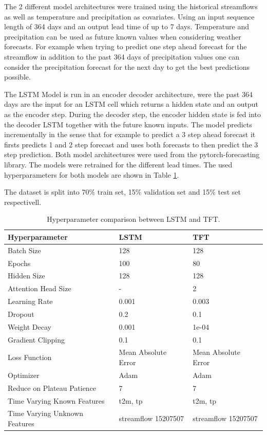 \documentclass[
]{krantz}
\begin{document}
The 2 different model architectures were trained using the historical streamflows as well as temperature and precipitation as covariates. Using an input sequence length of 364 days and an output lead time of up to 7 days. Temperature and precipitation can be used as future known values when considering weather forecasts. For example when trying to predict one step ahead forecast for the streamflow in addition to the past 364 days of precipitation values one can consider the precipitation forecast for the next day to get the best predictions possible.

The LSTM Model is run in an encoder decoder architecture, were the past 364 days are the input for an LSTM cell which returns a hidden state and an output as the encoder step. During the decoder step, the encoder hidden state is fed into the decoder LSTM together with the future known inputs. The model predicts incrementally in the sense that for example to predict a 3 step ahead forecast it firsts predicts 1 and 2 step forecast and uses both forecasts to then predict the 3 step prediction. Both model architectures were used from the pytorch-forecasting library. The models were retrained for the different lead times. The used hyperparameters for both models are shown in Table \ref{tab:tab-hyperparams}.

The dataset is split into 70\% train set, 15\% validation set and 15\% test set respectivell.

\begin{table}

\caption{\label{tab:tab-hyperparams}Hyperparameter comparison between LSTM and TFT.}
\centering
\begin{tabular}[t]{l|l|l}
\hline
Hyperparameter & LSTM & TFT\\
\hline
Batch Size & 128 & 128\\
\hline
Epochs & 100 & 80\\
\hline
Hidden Size & 128 & 128\\
\hline
Attention Head Size & - & 2\\
\hline
Learning Rate & 0.001 & 0.003\\
\hline
Dropout & 0.2 & 0.1\\
\hline
Weight Decay & 0.001 & 1e-04\\
\hline
Gradient Clipping & 0.1 & 0.1\\
\hline
Loss Function & Mean Absolute Error & Mean Absolute Error\\
\hline
Optimizer & Adam & Adam\\
\hline
Reduce on Plateau Patience & 7 & 7\\
\hline
Time Varying Known Features & t2m, tp & t2m, tp\\
\hline
Time Varying Unknown Features & streamflow 15207507 & streamflow 15207507\\
\hline
\end{tabular}
\end{table}
\end{document}
